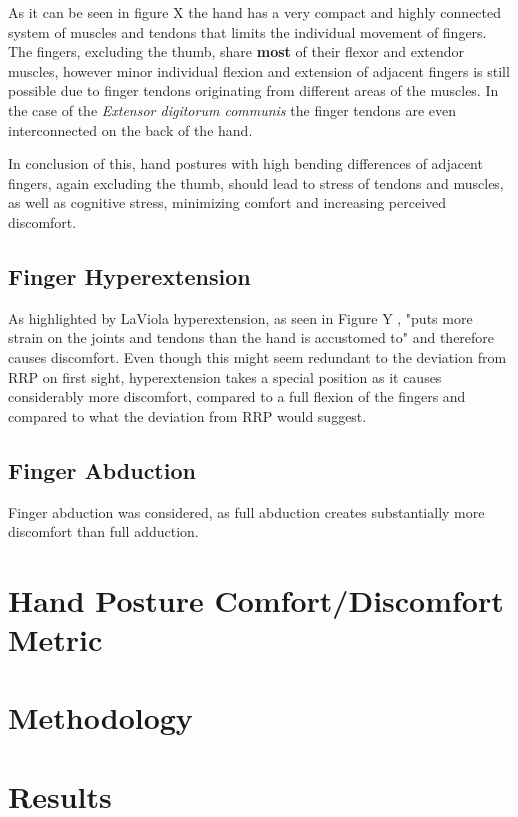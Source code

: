 \documentclass{sig-alternate-05-2015}
\begin{document}
As it can be seen in figure X
the hand has a very compact and highly connected system of muscles and tendons that limits the individual movement of fingers.
The fingers, excluding the thumb, share \textbf{most} of their flexor and extendor muscles, however minor individual flexion and extension of adjacent fingers is still possible due to finger tendons originating from different areas of the muscles. In the case of the \textit{Extensor digitorum communis} the finger tendons are even interconnected on the back of the hand.

In conclusion of this, hand postures with high bending differences of adjacent fingers, again excluding the thumb, should lead to stress of tendons and muscles, as well as cognitive stress, minimizing comfort and increasing perceived discomfort.

\subsection{Finger Hyperextension}

As highlighted by LaViola \cite{laviola1999survey} hyperextension, as seen in Figure Y
, "puts more strain on the joints and tendons than the hand is accustomed to" and therefore causes discomfort. Even though this might seem redundant to the deviation from RRP on first sight, hyperextension takes a special position as it causes considerably more discomfort, compared to a full flexion of the fingers and compared to what the deviation from RRP would suggest.

\subsection{Finger Abduction}

Finger abduction was considered, as full abduction creates substantially more discomfort than full adduction. 

\section{Hand Posture Comfort/Discomfort Metric}

\section{Methodology}

\section{Results}
\end{document}
